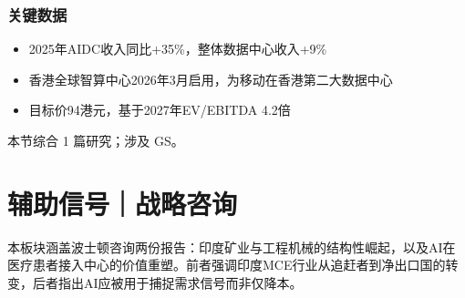 \documentclass[11pt]{ctexart}
\begin{document}
\subsubsection*{关键数据}
\begin{itemize}
  \item 2025年AIDC收入同比+35\%，整体数据中心收入+9\%
  \item 香港全球智算中心2026年3月启用，为移动在香港第二大数据中心
  \item 目标价94港元，基于2027年EV/EBITDA 4.2倍
\end{itemize}
{\small\color{refgray}本节综合 1 篇研究；涉及 GS。}
\newpage
\section{辅助信号｜战略咨询}
本板块涵盖波士顿咨询两份报告：印度矿业与工程机械的结构性崛起，以及AI在医疗患者接入中心的价值重塑。前者强调印度MCE行业从追赶者到净出口国的转变，后者指出AI应被用于捕捉需求信号而非仅降本。
\end{document}

